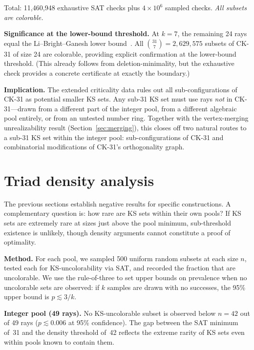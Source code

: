\documentclass[twocolumn,pra,superscriptaddress,nofootinbib]{revtex4-2}
\begin{document}
Total: 11{,}460{,}948 exhaustive SAT checks plus $4 \times 10^6$ sampled checks. \emph{All subsets are colorable.}

\textbf{Significance at the lower-bound threshold.} At $k = 7$, the remaining 24 rays equal the Li--Bright--Ganesh lower bound~\cite{LiBrightGanesh2024}. All $\binom{31}{7} = 2{,}629{,}575$ subsets of CK-31 of size 24 are colorable, providing explicit confirmation at the lower-bound threshold. (This already follows from deletion-minimality, but the exhaustive check provides a concrete certificate at exactly the boundary.)

\textbf{Implication.} The extended criticality data rules out all sub-configurations of CK-31 as potential smaller KS sets. Any sub-31 KS set must use rays \emph{not} in CK-31---drawn from a different part of the integer pool, from a different algebraic pool entirely, or from an untested number ring. Together with the vertex-merging unrealizability result (Section~\ref{sec:merging}), this closes off two natural routes to a sub-31 KS set within the integer pool: sub-configurations of CK-31 and combinatorial modifications of CK-31's orthogonality graph.

\section{Triad density analysis}
\label{sec:density}

The previous sections establish negative results for specific constructions. A complementary question is: how rare are KS sets within their own pools? If KS sets are extremely rare at sizes just above the pool minimum, sub-threshold existence is unlikely, though density arguments cannot constitute a proof of optimality.

\textbf{Method.} For each pool, we sampled 500 uniform random subsets at each size $n$, tested each for KS-uncolorability via SAT, and recorded the fraction that are uncolorable. We use the rule-of-three to set upper bounds on prevalence when no uncolorable sets are observed: if $k$ samples are drawn with no successes, the 95\% upper bound is $p \lesssim 3/k$.

\textbf{Integer pool (49 rays).} No KS-uncolorable subset is observed below $n = 42$ out of 49 rays ($p \lesssim 0.006$ at 95\% confidence). The gap between the SAT minimum of~31 and the density threshold of~42 reflects the extreme rarity of KS sets even within pools known to contain them.
\end{document}
